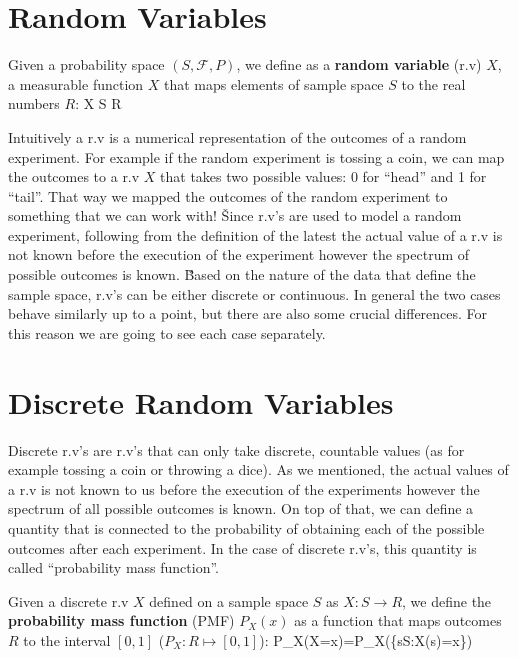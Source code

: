 \section{Random Variables}

Given a probability space $(S, \mathcal{F}, P)$, we define as a \textbf{random variable} (r.v) $X$, a measurable
function $X$ that maps elements of sample space $S$ to the real numbers $R$:
\bse
X \colon S \to R
\ese
\ed

Intuitively a r.v is a numerical representation of the outcomes of a random experiment. For example if the random
experiment is tossing a coin, we can map the outcomes to a r.v $X$ that takes two possible values: 0 for ``head''
and 1 for ``tail''. That way we mapped the outcomes of the random experiment to something that we can work with! \v

Since r.v's are used to model a random experiment, following from the definition of the latest the actual value of a
r.v is not known before the execution of the experiment however the spectrum of possible outcomes is known. \v

Based on the nature of the data that define the sample space, r.v's can be either discrete or continuous. In general
the two cases behave similarly up to a point, but there are also some crucial differences. For this reason we are
going to see each case separately.

\section{Discrete Random Variables}

Discrete r.v's are r.v's that can only take discrete, countable values (as for example tossing a coin or throwing a
dice). As we mentioned, the actual values of a r.v is not known to us before the execution of the experiments however
the spectrum of all possible outcomes is known. On top of that, we can define a quantity that is connected to the
probability of obtaining each of the possible outcomes after each experiment. In the case of discrete r.v's, this
quantity is called ``probability mass function''.

Given a discrete r.v $X$ defined on a sample space $S$ as $X \colon S \to R$, we define the \textbf{probability mass
function} (PMF) $P_{X}(x)$ as a function that maps outcomes $R$ to the interval $[0,1]$ ($P_{X}:R\mapsto [0,1]$):
\bse
P_{X}(X=x)=P_{X}(\{s\in S:X(s)=x\})
\ese

